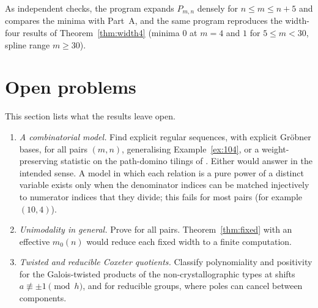 \documentclass[11pt,a4paper]{article}
\theoremstyle{definition}\newtheorem{definition}[theorem]{Definition}
\theoremstyle{remark}\newtheorem{remark}[theorem]{Remark}\newtheorem{example}[theorem]{Example}
\numberwithin{equation}{section}
\begin{document}
As independent checks, the program expands $P_{m,n}$ densely for $n\le m\le n+5$ and compares the minima with Part~A, and the same program reproduces the width-four results of Theorem~\ref{thm:width4} (minima $0$ at $m=4$ and $1$ for $5\le m<30$, spline range $m\ge30$).

\section{Open problems}\label{sec:open}
This section lists what the results leave open.
\begin{enumerate}
\item \emph{A combinatorial model.} Find explicit regular sequences, with explicit Gr\"obner bases, for all pairs $(m,n)$, generalising Example~\ref{ex:104}, or a weight-preserving statistic on the path-domino tilings of \cite{bck}. Either would answer \cite[Open Problems~4.3 and~5.4]{bck} in the intended sense. A model in which each relation is a pure power of a distinct variable exists only when the denominator indices can be matched injectively to numerator indices that they divide; this fails for most pairs (for example $(10,4)$).
\item \emph{Unimodality in general.} Prove \cite[Conj.~2.5]{bck} for all pairs. Theorem~\ref{thm:fixed} with an effective $m_0(n)$ would reduce each fixed width to a finite computation.
\item \emph{Twisted and reducible Coxeter quotients.} Classify polynomiality and positivity for the Galois-twisted products of the non-crystallographic types at shifts $a\not\equiv\pm1\pmod h$, and for reducible groups, where poles can cancel between components.
\end{enumerate}
\end{document}

